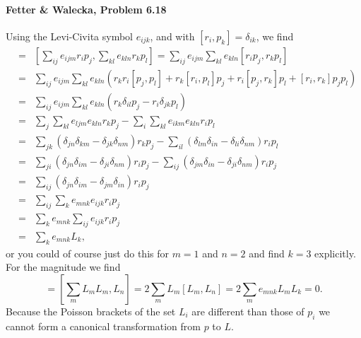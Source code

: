\documentclass[letterpaper,11pt]{article}
\begin{document}
\paragraph{Fetter \& Walecka, Problem 6.18}
Using the Levi-Civita symbol $e_{ijk}$, and with $[r_i,p_k] = \delta_{ik}$, we find
\begin{eqnarray*}
 [L_m,L_n] & = & \left[ \sum_{ij} e_{ijm} r_i p_j, \sum_{kl} e_{kln} r_k p_l \right] = \sum_{ij} e_{ijm} \sum_{kl} e_{kln} [r_i p_j, r_k p_l] \\
 & = & \sum_{ij} e_{ijm} \sum_{kl} e_{kln} \left( r_k r_i [p_j, p_l] + r_k [r_i, p_l] p_j + r_i [p_j,r_k] p_l + [r_i, r_k] p_j p_l \right) \\
 & = & \sum_{ij} e_{ijm} \sum_{kl} e_{kln} \left( r_k \delta_{il} p_j - r_i \delta_{jk} p_l \right) \\
 & = & \sum_j \sum_{kl} e_{ljm} e_{kln} r_k p_j - \sum_i \sum_{kl} e_{ikm} e_{kln} r_i p_l \\
 & = & \sum_{jk} (\delta_{jn} \delta_{km} - \delta_{jk} \delta_{nm}) r_k p_j - \sum_{il} (\delta_{lm} \delta_{in} - \delta_{li} \delta_{nm}) r_i p_l \\
 & = & \sum_{ji} (\delta_{jn} \delta_{im} - \delta_{ji} \delta_{nm}) r_i p_j - \sum_{ij} (\delta_{jm} \delta_{in} - \delta_{ji} \delta_{nm}) r_i p_j \\
 & = & \sum_{ij} (\delta_{jn} \delta_{im} - \delta_{jm} \delta_{in}) r_i p_j \\
 & = & \sum_{ij} \sum_{k} e_{mnk} e_{ijk} r_i p_j \\
 & = & \sum_{k} e_{mnk} \sum_{ij} e_{ijk} r_i p_j \\
 & = & \sum_k e_{mnk} L_k,
\end{eqnarray*}
or you could of course just do this for $m = 1$ and $n = 2$ and find $k = 3$ explicitly.  For the magnitude we find
\begin{equation*}
 [L^2,L_n] = [\sum_m L_m L_m,L_n] = 2 \sum_m L_m [L_m,L_n] = 2 \sum_m e_{mnk} L_m L_k = 0.
\end{equation*}
Because the Poisson brackets of the set $L_i$ are different than those of $p_i$ we cannot form a canonical transformation from $p$ to $L$.
\end{document}
